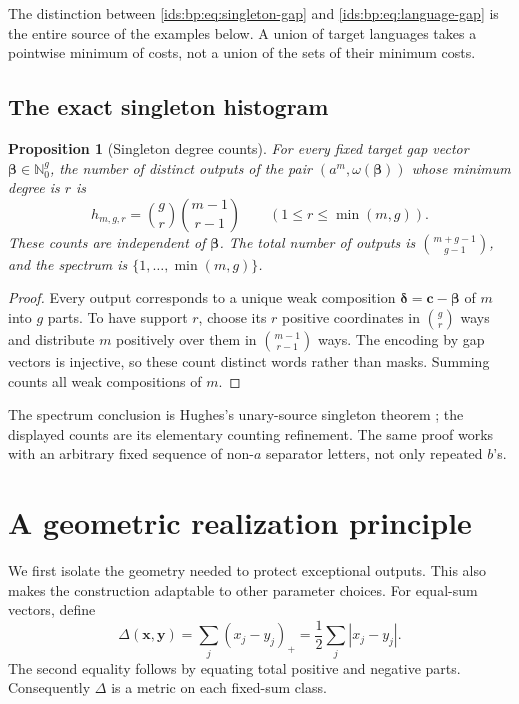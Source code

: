 \documentclass[11pt,letterpaper]{article}
\newtheorem{proposition}[theorem]{Proposition}
\theoremstyle{definition}\newtheorem{definition}[theorem]{Definition}
\theoremstyle{remark}\newtheorem{remark}[theorem]{Remark}
\theoremstyle{definition}\newtheorem{question}[theorem]{Question}
\newcommand{\Nzero}{\mathbb N_0}
\newcommand{\bppos}[1]{(#1)_+}
\newcommand{\bpgap}[1]{\omega(#1)}
\begin{document}
The distinction between \eqref{ids:bp:eq:singleton-gap} and
\eqref{ids:bp:eq:language-gap} is the entire source of the examples below. A
union of target languages takes a pointwise minimum of costs, not a union of
the sets of their minimum costs.

\subsection{The exact singleton histogram}
\begin{proposition}[Singleton degree counts]
\label{ids:bp:prop:histogram}
For every fixed target gap vector $\boldsymbol\beta\in\Nzero^g$, the number
of distinct outputs of the pair $(a^m,\bpgap{\boldsymbol\beta})$ whose minimum
degree is $r$ is
\begin{equation}
 h_{m,g,r}=\binom gr\binom{m-1}{r-1}
 \qquad(1\leq r\leq\min(m,g)).
 \label{ids:bp:eq:histogram}
\end{equation}
These counts are independent of $\boldsymbol\beta$. The total number of
outputs is $\binom{m+g-1}{g-1}$, and the spectrum is
$\{1,\ldots,\min(m,g)\}$.
\end{proposition}
\begin{proof}
Every output corresponds to a unique weak composition
$\boldsymbol\delta=\mathbf c-\boldsymbol\beta$ of $m$ into $g$ parts.
To have support $r$, choose its $r$ positive coordinates in $\binom gr$ ways
and distribute $m$ positively over them in $\binom{m-1}{r-1}$ ways.
The encoding by gap vectors is injective, so these count distinct words rather
than masks. Summing counts all weak compositions of $m$.
\end{proof}

The spectrum conclusion is Hughes's unary-source singleton theorem
\cite[Theorem~9]{Hughes2026}; the displayed counts are its elementary
counting refinement. The same proof works with an arbitrary fixed sequence of
non-$a$ separator letters, not only repeated $b$'s.

\section{A geometric realization principle}
\label{ids:bp:sec:geometry}

We first isolate the geometry needed to protect exceptional outputs. This
also makes the construction adaptable to other parameter choices.
For equal-sum vectors, define
\begin{equation}
 \Delta(\mathbf x,\mathbf y)
   =\sum_j\bppos{x_j-y_j}
   =\frac12\sum_j|x_j-y_j|.
 \label{ids:bp:eq:distance}
\end{equation}
The second equality follows by equating total positive and negative parts.
Consequently $\Delta$ is a metric on each fixed-sum class.
\end{document}
